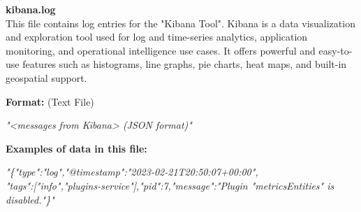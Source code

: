 \begin{description}
\begin{addmargin}[0em]{0em}
    \label{kibana.log}
    \begin{addmargin}[1em]{0em} %
        \textbf{kibana.log}\\
        This file contains log entries for the "Kibana Tool".
        Kibana is a data visualization and exploration tool used for log and time-series analytics, application monitoring,
        and operational intelligence use cases. It offers powerful and easy-to-use features such as histograms,
        line graphs, pie charts, heat maps, and built-in geospatial support.
        \begin{addmargin}[1em]{0em}
            \textbf{Format:} (Text File)
            \begin{addmargin}[1em]{0em}
                \textit{"<messages from Kibana> (JSON format)"}
            \end{addmargin}
        \end{addmargin}
        \begin{addmargin}[1em]{0em}
            \textbf{Examples of data in this file:}
            \begin{addmargin}[1em]{0em}\textit{"\{"type":"log","@timestamp":"2023-02-21T20:50:07+00:00",\\
                "tags":["info","plugins-service"],"pid":7,"message":"Plugin "metricsEntities" is disabled."\}"}
            \end{addmargin}
        \end{addmargin}
    \end{addmargin} %
    \textbf{\\}


\end{addmargin}
\end{description}
